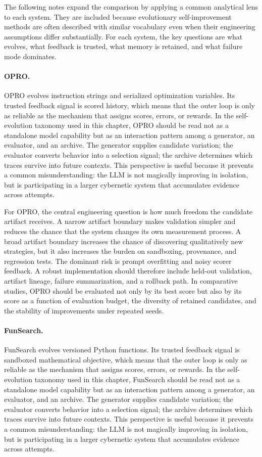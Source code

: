 The following notes expand the comparison by applying a common analytical lens to each system.  They are included because evolutionary self-improvement methods are often described with similar vocabulary even when their engineering assumptions differ substantially.  For each system, the key questions are what evolves, what feedback is trusted, what memory is retained, and what failure mode dominates.

\paragraph{OPRO.} OPRO evolves instruction strings and serialized optimization variables.  Its trusted feedback signal is scored history, which means that the outer loop is only as reliable as the mechanism that assigns scores, errors, or rewards.  In the self-evolution taxonomy used in this chapter, OPRO should be read not as a standalone model capability but as an interaction pattern among a generator, an evaluator, and an archive.  The generator supplies candidate variation; the evaluator converts behavior into a selection signal; the archive determines which traces survive into future contexts.  This perspective is useful because it prevents a common misunderstanding: the LLM is not magically improving in isolation, but is participating in a larger cybernetic system that accumulates evidence across attempts.

For OPRO, the central engineering question is how much freedom the candidate artifact receives.  A narrow artifact boundary makes validation simpler and reduces the chance that the system changes its own measurement process.  A broad artifact boundary increases the chance of discovering qualitatively new strategies, but it also increases the burden on sandboxing, provenance, and regression tests.  The dominant risk is prompt overfitting and noisy scorer feedback.  A robust implementation should therefore include held-out validation, artifact lineage, failure summarization, and a rollback path.  In comparative studies, OPRO should be evaluated not only by its best score but also by its score as a function of evaluation budget, the diversity of retained candidates, and the stability of improvements under repeated seeds.

\paragraph{FunSearch.} FunSearch evolves versioned Python functions.  Its trusted feedback signal is sandboxed mathematical objective, which means that the outer loop is only as reliable as the mechanism that assigns scores, errors, or rewards.  In the self-evolution taxonomy used in this chapter, FunSearch should be read not as a standalone model capability but as an interaction pattern among a generator, an evaluator, and an archive.  The generator supplies candidate variation; the evaluator converts behavior into a selection signal; the archive determines which traces survive into future contexts.  This perspective is useful because it prevents a common misunderstanding: the LLM is not magically improving in isolation, but is participating in a larger cybernetic system that accumulates evidence across attempts.

